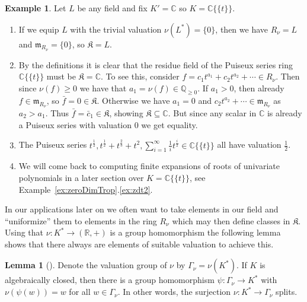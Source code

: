 \documentclass[
  paper=a4,
  titlepage,
  bibliography=totoc,
  pagesize=pdftex
]{scrartcl}
\numberwithin{figure}{section}
\numberwithin{equation}{section}
\numberwithin{table}{section}
\newcommand*\setR{\mathds{R}}
\newcommand*\setC{\mathds{C}}
\newcommand*\setQ{\mathds{Q}}
\newcommand*\puiseux[2]{#1\{\!\{#2\}\!\}}
\newcommand*\CCt{\puiseux{\setC}{t}}
\theoremstyle{definition}
\newtheorem{example}[definition]{Example}
\newtheorem{lemma}[definition]{Lemma}
\numberwithin{definition}{section}
\begin{document}
\begin{example} \label{ex:valuations}
  Let $L$ be any field and fix $K' = \setC$ so $K = \CCt$.
  \begin{enumerate}
    \item If we equip $L$ with the trivial valuation $\nu(L^*) = \{0\}$, then we have
      $R_\nu = L$ and $\mathfrak m_{R_\nu} = \{0\}$, so $\mathfrak K = L$.
    \item By the definitions it is clear that the residue field of the Puiseux series ring
      $\CCt$ must be $\mathfrak K = \setC$. To see this, consider $f =
      c_1t^{a_1}+c_2t^{a_2}+\cdots \in R_{\nu}$. Then since $\nu(f) \geq 0$ we have that
      $a_1 = \nu(f) \in \setQ_{\geq0}$. If $a_1 > 0$, then already $f \in \mathfrak
      m_{R_\nu}$, so $\bar f = 0 \in \mathfrak K$. Otherwise we have $a_1 = 0$ and
      $c_2t^{a_2} + \cdots \in \mathfrak m_{R_\nu}$ as $a_2 > a_1$. Thus $\bar f = \bar
      c_1 \in \mathfrak K$, showing $\mathfrak K \subseteq \setC$. But since any scalar in
      $\setC$ is already a Puiseux series with valuation 0 we get equality.
    \item The Puiseux series $t^{\frac12}, t^{\frac12} + t^{\frac23} + t^2,
      \sum_{i=1}^\infty \frac1i t^{\frac i2} \in \CCt$ all have valuation $\frac12$.
    \item We will come back to computing finite expansions of roots of univariate
      polynomials in a later section over $K = \CCt$, see
      Example~\ref{ex:zeroDimTrop}.\ref{ex:zdt2}.
  \end{enumerate}
\end{example}

In our applications later on we often want to take elements in our field and
\enquote{uniformize} them to elements in the ring $R_{\nu}$ which may then define classes
in $\mathfrak K$. Using that $\nu : K^* \to (\setR, +)$ is a group homomorphism the
following lemma shows that there always are elements of suitable valuation to achieve
this.

\begin{lemma}[{\cite[Lemma~2.1.15]{sturmMacTrop}}]
  \label{lem:valSplit}
  Denote the valuation group of $\nu$ by $\Gamma_\nu = \nu(K^*)$. If $K$ is algebraically
  closed, then there is a group homomorphism $\psi : \Gamma_\nu \to K^*$ with
  $\nu(\psi(w)) = w$ for all $w \in \Gamma_\nu$. In other words, the surjection $\nu : K^*
  \to \Gamma_\nu$ splits.
\end{lemma}
\end{document}
